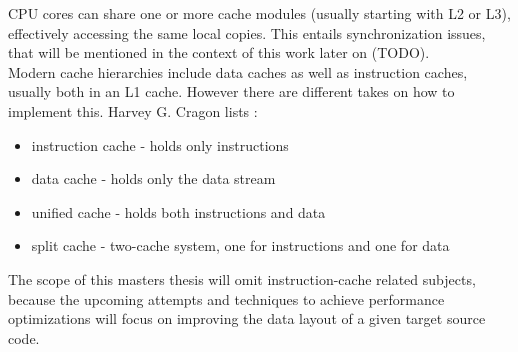 CPU cores can share one or more cache modules (usually starting with L2 or L3), effectively accessing the same local copies. This entails synchronization issues, that will be mentioned in the context of this work later on (TODO).\\
Modern cache hierarchies include data caches as well as instruction caches, usually both in an L1 cache. However there are different takes on how to implement this. Harvey G. Cragon lists :
\begin{itemize}
	\item instruction cache - holds only instructions
	\item data cache - holds only the data stream
	\item unified cache - holds both instructions and data
	\item split cache - two-cache system, one for instructions and one for data
\end{itemize}
The scope of this masters thesis will omit instruction-cache related subjects, because the upcoming attempts and techniques to achieve performance optimizations will focus on improving the data layout of a given target source code.

